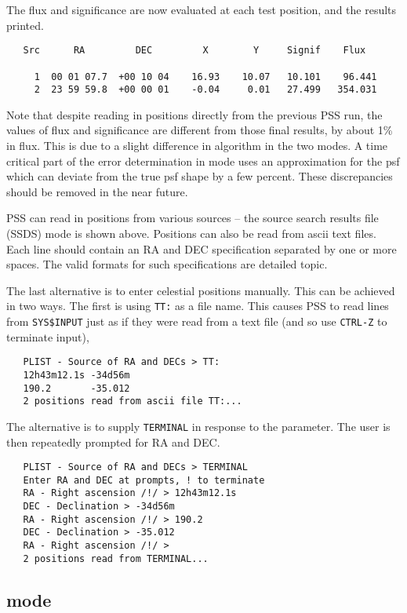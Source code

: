 The flux and significance are now evaluated at each test position,
and the results printed.
\begin{verbatim}
   Src      RA         DEC         X        Y     Signif    Flux

     1  00 01 07.7  +00 10 04    16.93    10.07   10.101    96.441
     2  23 59 59.8  +00 00 01    -0.04     0.01   27.499   354.031
\end{verbatim}

Note that despite reading in positions directly from the previous PSS
run, the values of flux and significance are different from those
final results, by about 1\% in flux. This is due to a slight difference
in algorithm in the two modes. A time critical part of the error
determination in  mode uses an approximation for the psf
which can deviate from the true psf shape by a few percent. These
discrepancies should be removed in the near future.

PSS can read in positions from various sources -- the source search results
file (SSDS) mode is shown above. Positions can also be read from ascii
text files. Each line should contain an RA and DEC specification separated
by one or more spaces. The valid formats for such specifications are
detailed  topic.

The last alternative is to enter celestial positions manually. This can be
achieved in two ways. The first is using \verb+TT:+ as a file name. This
causes PSS to read lines from \verb+SYS$INPUT+ just as if they were read from
a text file (and so use \verb+CTRL-Z+ to terminate input),
\begin{verbatim}
   PLIST - Source of RA and DECs > TT:
   12h43m12.1s -34d56m
   190.2       -35.012
   2 positions read from ascii file TT:...
\end{verbatim}
The alternative is to supply \verb+TERMINAL+ in response to the 
parameter. The user is then repeatedly prompted for RA and DEC.
\begin{verbatim}
   PLIST - Source of RA and DECs > TERMINAL
   Enter RA and DEC at prompts, ! to terminate
   RA - Right ascension /!/ > 12h43m12.1s
   DEC - Declination > -34d56m
   RA - Right ascension /!/ > 190.2
   DEC - Declination > -35.012
   RA - Right ascension /!/ > 
   2 positions read from TERMINAL...
\end{verbatim}


\subsection{ mode}
\label{pss:tut:uplim}

